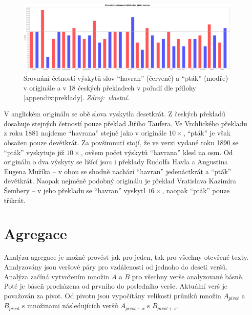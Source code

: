 \documentclass[dp.tex]{subfiles}
\begin{document}
\begin{figure}[h!]
	\centering
	\includegraphics[max width=\textwidth,keepaspectratio=true]{imgs-70-prakticka/cetnost-slov-orig}
	\caption[Srovnání četností výskytů slov \enquote{havran} a \enquote{pták} v originále a v 18 českých překladech.]{Srovnání četností výskytů slov \enquote{havran} (červeně) a \enquote{pták} (modře) v originále a v 18 českých překladech v pořadí dle přílohy \ref{appendix:preklady}. \textit{Zdroj:~vlastní.}}
	\label{fig:word-freq-compare}
\end{figure}

V anglickém originálu se obě slova vyskytla desetkrát. Z českých překladů dosahuje stejných četností pouze překlad Jiřího Taufera. Ve Vrchlického překladu z roku 1881 najdeme \mbox{\enquote{havrana}} stejně jako v originále $10\times$, \enquote{pták} je však obsažen pouze devětkrát. Za povšimnutí stojí, že ve verzi vydané roku 1890 se \enquote{pták} vyskytuje již $10\times$, ovšem počet výskytů \enquote{havrana} klesl na osm. Od originálu o dva výskyty se lišící jsou i překlady Rudolfa Havla a Augustina Eugena Mužíka -- v obou se shodně nachází \enquote{havran} jedenáctkrát a \enquote{pták} devětkrát. Naopak nejméně podobný originálu je překlad Vratislava Kazimíra Šembery -- v jeho překladu se \enquote{havran} vyskytl $16\times$, naopak \enquote{pták} pouze třikrát.

\section{Agregace}

Analýzu agregace je možné provést jak pro jeden, tak pro všechny otevřené texty. Analyzovány jsou veršové páry pro vzdálenosti od jednoho do deseti veršů. Analýza začíná vytvořením množin $A$ a $B$ pro všechny verše analyzované básně. Poté je báseň procházena od prvního do posledního verše. Aktuální verš je považován za pivot. Od pivotu jsou vypočítány velikosti průniků množin $A_{pivot}$ a $B_{pivot}$ s množinami následujících veršů $A_{pivot + x}$  s $B_{pivot + x}$. 
\end{document}

